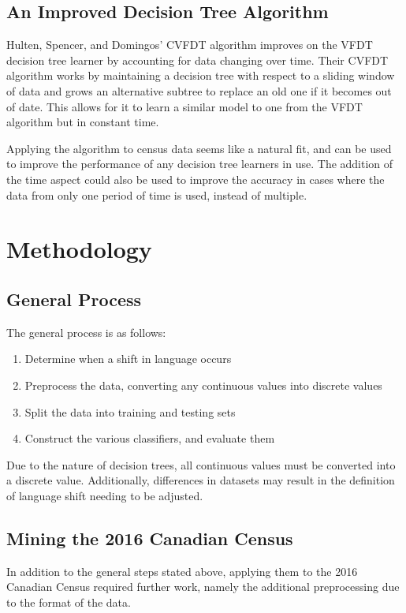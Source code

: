 \documentclass[10pt, conference, compsocconf]{IEEEtran}
\begin{document}
\subsection{An Improved Decision Tree Algorithm}
Hulten, Spencer, and Domingos' CVFDT algorithm improves on the VFDT decision tree learner by accounting for data changing over time. \cite{dtrees1} Their CVFDT algorithm works by maintaining a decision tree with respect to a sliding window of data and grows an alternative subtree to replace an old one if it becomes out of date. This allows for it to learn a similar model to one from the VFDT algorithm but in constant time. \cite{dtrees1}

Applying the algorithm to census data seems like a natural fit, and can be used to improve the performance of any decision tree learners in use. The addition of the time aspect could also be used to improve the accuracy in cases where the data from only one period of time is used, instead of multiple.


\section{Methodology}

\subsection{General Process}

The general process is as follows:
\begin{enumerate}
	\item Determine when a shift in language occurs
	\item Preprocess the data, converting any continuous values into discrete values
	\item Split the data into training and testing sets
	\item Construct the various classifiers, and evaluate them
\end{enumerate}

Due to the nature of decision trees, all continuous values must be converted into a discrete value. Additionally, differences in datasets may result in the definition of language shift needing to be adjusted.

\subsection{Mining the 2016 Canadian Census}
In addition to the general steps stated above, applying them to the 2016 Canadian Census required further work, namely the additional preprocessing due to the format of the data.
\end{document}
